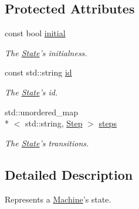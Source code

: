 \subsection*{Protected Attributes}
\begin{DoxyCompactItemize}
\item 
\hypertarget{classfsml_1_1State_aeb0c3fe997b186b77e3c363709a1bfea}{const bool \hyperlink{classfsml_1_1State_aeb0c3fe997b186b77e3c363709a1bfea}{initial}}\label{classfsml_1_1State_aeb0c3fe997b186b77e3c363709a1bfea}

\begin{DoxyCompactList}\small\item\em The \hyperlink{classfsml_1_1State}{State}'s initialness. \end{DoxyCompactList}\item 
\hypertarget{classfsml_1_1State_a4acc37de347d0e4a66d6470a4d6ebcf7}{const std\-::string \hyperlink{classfsml_1_1State_a4acc37de347d0e4a66d6470a4d6ebcf7}{id}}\label{classfsml_1_1State_a4acc37de347d0e4a66d6470a4d6ebcf7}

\begin{DoxyCompactList}\small\item\em The \hyperlink{classfsml_1_1State}{State}'s id. \end{DoxyCompactList}\item 
\hypertarget{classfsml_1_1State_af9c12ff54dd9712d43b3a10609445642}{std\-::unordered\-\_\-map\\*
$<$ std\-::string, \hyperlink{classfsml_1_1Step}{Step} $>$ \hyperlink{classfsml_1_1State_af9c12ff54dd9712d43b3a10609445642}{steps}}\label{classfsml_1_1State_af9c12ff54dd9712d43b3a10609445642}

\begin{DoxyCompactList}\small\item\em The \hyperlink{classfsml_1_1State}{State}'s transitions. \end{DoxyCompactList}\end{DoxyCompactItemize}


\subsection{Detailed Description}
Represents a \hyperlink{classfsml_1_1Machine}{Machine}'s state. 



